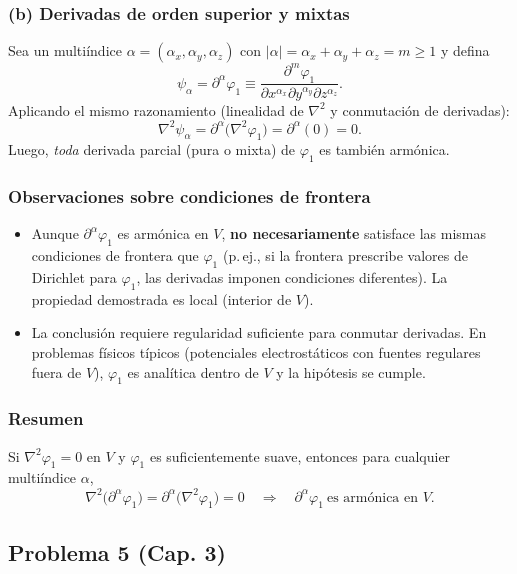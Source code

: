 \documentclass{article}
\begin{document}
\subsubsection*{(b) Derivadas de orden superior y mixtas}
Sea un multiíndice $\alpha=(\alpha_{x},\alpha_{y},\alpha_{z})$ con $|\alpha|=\alpha_{x}+\alpha_{y}+\alpha_{z}=m\ge 1$ y defina
\[
\psi_{\alpha}=\partial^{\alpha}\varphi_{1}\equiv
\frac{\partial^{m}\varphi_{1}}{\partial x^{\alpha_{x}}\partial y^{\alpha_{y}}\partial z^{\alpha_{z}}}.
\]
Aplicando el mismo razonamiento (linealidad de $\nabla^{2}$ y conmutación de derivadas):
\[
\nabla^{2}\psi_{\alpha}
=\partial^{\alpha}\big(\nabla^{2}\varphi_{1}\big)=\partial^{\alpha}(0)=0.
\]
Luego, \emph{toda} derivada parcial (pura o mixta) de $\varphi_{1}$ es también armónica.

\subsubsection*{Observaciones sobre condiciones de frontera}
\begin{itemize}
\item Aunque $\partial^{\alpha}\varphi_{1}$ es armónica en $V$, \textbf{no necesariamente} satisface las mismas condiciones de frontera que $\varphi_{1}$ (p.\,ej., si la frontera prescribe valores de Dirichlet para $\varphi_{1}$, las derivadas imponen condiciones diferentes). La propiedad demostrada es local (interior de $V$).
\item La conclusión requiere regularidad suficiente para conmutar derivadas. En problemas físicos típicos (potenciales electrostáticos con fuentes regulares fuera de $V$), $\varphi_{1}$ es analítica dentro de $V$ y la hipótesis se cumple.
\end{itemize}

\subsubsection*{Resumen}
Si $\nabla^{2}\varphi_{1}=0$ en $V$ y $\varphi_{1}$ es suficientemente suave, entonces para cualquier multiíndice $\alpha$,
\[
\boxed{\ \nabla^{2}\!\big(\partial^{\alpha}\varphi_{1}\big)=\partial^{\alpha}\!\big(\nabla^{2}\varphi_{1}\big)=0\quad\Rightarrow\quad \partial^{\alpha}\varphi_{1}\ \text{es armónica en }V.\ }
\]

\subsection{Problema 5 (Cap. 3)} \vspace{0.5cm}
\end{document}
